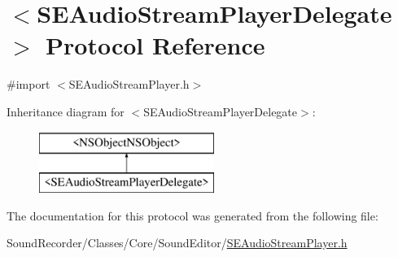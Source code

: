 \hypertarget{protocol_s_e_audio_stream_player_delegate-p}{\section{$<$S\-E\-Audio\-Stream\-Player\-Delegate$>$ Protocol Reference}
\label{protocol_s_e_audio_stream_player_delegate-p}
}


{\ttfamily \#import $<$S\-E\-Audio\-Stream\-Player.\-h$>$}

Inheritance diagram for $<$S\-E\-Audio\-Stream\-Player\-Delegate$>$\-:\begin{figure}[H]
\begin{center}
\leavevmode
\includegraphics[height=2.000000cm]{protocol_s_e_audio_stream_player_delegate-p}
\end{center}
\end{figure}


The documentation for this protocol was generated from the following file\-:\begin{DoxyCompactItemize}
\item 
Sound\-Recorder/\-Classes/\-Core/\-Sound\-Editor/\hyperlink{_s_e_audio_stream_player_8h}{S\-E\-Audio\-Stream\-Player.\-h}\end{DoxyCompactItemize}

